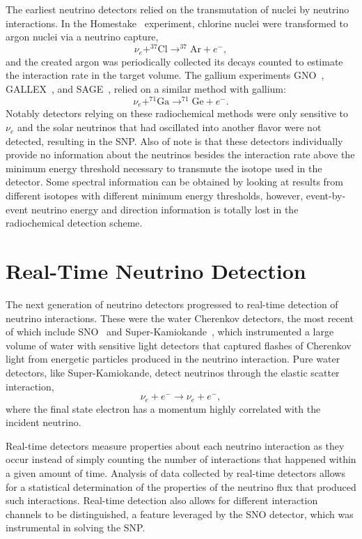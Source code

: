 The earliest neutrino detectors relied on the transmutation of nuclei by neutrino interactions. 
In the Homestake~\cite{homestake} experiment, chlorine nuclei were transformed to argon nuclei via a neutrino capture,
\begin{equation}
\nu_e + ^{37}\mathrm{Cl} \rightarrow ^{37}\mathrm{Ar} + e^-,
\end{equation}
and the created argon was periodically collected its decays counted to estimate the interaction rate in the target volume.
The gallium experiments GNO~\cite{gno}, GALLEX~\cite{gallex}, and SAGE~\cite{sagecombo}, relied on a similar method with gallium:
\begin{equation}
\nu_e + ^{71}\mathrm{Ga} \rightarrow ^{71}\mathrm{Ge} + e^-.
\end{equation}
Notably detectors relying on these radiochemical methods were only sensitive to $\nu_e$ and the solar neutrinos that had oscillated into another flavor were not detected, resulting in the SNP.
Also of note is that these detectors individually provide no information about the neutrinos besides the interaction rate above the minimum energy threshold necessary to transmute the isotope used in the detector. 
Some spectral information can be obtained by looking at results from different isotopes with different minimum energy thresholds, however, event-by-event neutrino energy and direction information is totally lost in the radiochemical detection scheme.

\section{Real-Time Neutrino Detection}

The next generation of neutrino detectors progressed to real-time detection of neutrino interactions.
These were the water Cherenkov detectors, the most recent of which include SNO~\cite{3phase} and Super-Kamiokande~\cite{superk}, which instrumented a large volume of water with sensitive light detectors that captured flashes of Cherenkov light from energetic particles produced in the neutrino interaction.
Pure water detectors, like Super-Kamiokande, detect neutrinos through the elastic scatter interaction,
\begin{equation}
\nu_e + e^- \rightarrow \nu_e + e^-,
\end{equation}
where the final state electron has a momentum highly correlated with the incident neutrino.

Real-time detectors measure properties about each neutrino interaction as they occur instead of simply counting the number of interactions that happened within a given amount of time.
Analysis of data collected by real-time detectors allows for a statistical determination of the properties of the neutrino flux that produced such interactions.
Real-time detection also allows for different interaction channels to be distinguished, a feature leveraged by the SNO detector, which was instrumental in solving the SNP.

